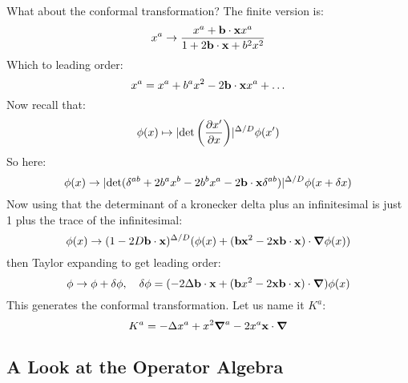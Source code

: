 What about the conformal transformation? The finite version is:
\begin{equation}
    x^a \to \frac{x^a + \mathbf{b} \cdot \mathbf{x}x^a}{1 + 2\mathbf{b} \cdot \mathbf{x} + b^2x^2}
\end{equation}
Which to leading order:
\begin{equation}
    x^a = x^a + b^ax^2 - 2\mathbf{b} \cdot \mathbf{x}x^a + \ldots
\end{equation}
Now recall that:
\begin{equation}
    \phi(x) \mapsto \abs{\det\left(\dpd{x'}{x}\right)}^{\Delta/D}\phi(x')
\end{equation}
So here:
\begin{equation}
    \phi(x) \to \abs{\det(\delta^{ab} + 2b^ax^b - 2b^bx^a - 2\v{b} \cdot \v{x}\delta^{ab})}^{\Delta/D}\phi(x + \delta x)
\end{equation}
Now using that the determinant of a kronecker delta plus an infinitesimal is just 1 plus the trace of the infinitesimal:
\begin{equation}
    \phi(x) \to (1 - 2D\v{b}\cdot\v{x})^{\Delta/D}(\phi(x) + (\v{b}\v{x}^2 - 2\v{x}\v{b} \cdot \v{x})\cdot \nabla \phi(x))
\end{equation}
then Taylor expanding to get leading order:
\begin{equation}
    \phi \to \phi + \delta\phi, \quad \delta\phi = (-2\Delta \v{b} \cdot \v{x} + (\v{b}x^2 - 2\v{x}\v{b} \cdot \v{x})\cdot \nabla)\phi(x)
\end{equation}
This generates the conformal transformation. Let us name it $K^a$:
\begin{equation}
    K^a = -\Delta x^a + x^2\nabla^a - 2x^a\v{x} \cdot \nabla
\end{equation}

\subsection{A Look at the Operator Algebra}

